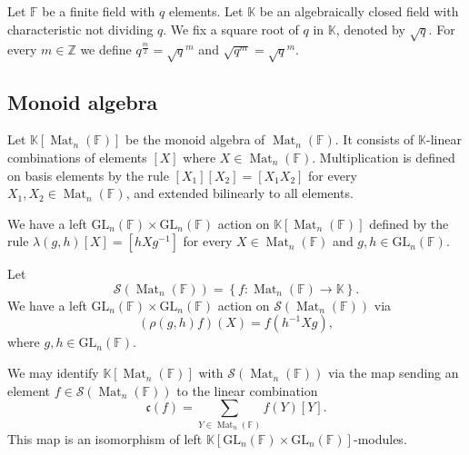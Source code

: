 \documentclass[12pt, reqno]{amsart}
\theoremstyle{definition}
\newcommand{\zIntegers}{\mathbb{Z}}
\newcommand{\coefficientsField}{\mathbb{K}}
\newcommand{\GL}{\mathrm{GL}}
\newcommand{\finiteField}{\mathbb{F}}
\newcommand{\squareMatrix}{\operatorname{Mat}}
\newcommand{\Schwartz}{\mathcal{S}}
\newcommand{\algebraIsomorphism}{\mathfrak{c}}
\begin{document}
Let $\finiteField$ be a finite field with $q$ elements. Let $\coefficientsField$ be an algebraically closed field with characteristic not dividing $q$. We fix a square root of $q$ in $\coefficientsField$, denoted by $\sqrt{q}$. For every $m \in \zIntegers$ we define $q^{\frac{m}{2}} = \sqrt{q}^m$ and $\sqrt{q^m} = \sqrt{q}^m$.

\subsection{Monoid algebra}

Let $\coefficientsField\left[\squareMatrix_n\left(\finiteField\right)\right]$ be the monoid algebra of $\squareMatrix_n\left(\finiteField\right)$. It consists of $\coefficientsField$-linear combinations of elements $\left[X\right]$ where $X \in \squareMatrix_n\left(\finiteField\right)$. Multiplication is defined on basis elements by the rule $\left[X_1\right] \left[X_2\right] = \left[X_1 X_2\right]$ for every $X_1, X_2 \in \squareMatrix_n\left(\finiteField\right)$, and extended bilinearly to all elements.

We have a left $\GL_n\left(\finiteField\right) \times \GL_n\left(\finiteField\right)$ action on $\coefficientsField\left[\squareMatrix_n\left(\finiteField\right)\right]$ defined by the rule $\lambda\left(g,h\right)\left[X\right] = \left[h X g^{-1}\right]$ for every $X \in \squareMatrix_n\left(\finiteField\right)$ and $g,h \in \GL_n\left(\finiteField\right)$.

Let
\begin{displaymath}
 \Schwartz\left(\squareMatrix_n\left(\finiteField\right)\right) = \left\{ f \colon \squareMatrix_n\left(\finiteField\right) \to \coefficientsField \right\}.
 \end{displaymath}
   We have a left $\GL_n\left(\finiteField\right) \times \GL_n\left(\finiteField\right)$ action on $\Schwartz\left(\squareMatrix_n\left(\finiteField\right)\right)$ via
   \begin{displaymath}
   \left(\rho\left(g,h\right) f\right)\left(X\right) = f\left(h^{-1} X g\right),
   \end{displaymath}
where $g,h \in \GL_n\left(\finiteField\right)$.

We may identify $\coefficientsField\left[\squareMatrix_n\left(\finiteField\right)\right]$ with $\Schwartz\left(\squareMatrix_n\left(\finiteField\right)\right)$ via the map sending an element $f \in \Schwartz\left(\squareMatrix_n\left(\finiteField\right)\right)$ to the linear combination
\begin{displaymath}
\algebraIsomorphism\left(f\right) = \sum_{Y \in \squareMatrix_n\left(\finiteField\right)} f\left(Y\right) \left[Y\right].
\end{displaymath}
This map is an isomorphism of left $\coefficientsField\left[\GL_n\left(\finiteField\right) \times \GL_n\left(\finiteField\right)\right]$-modules.
\end{document}
